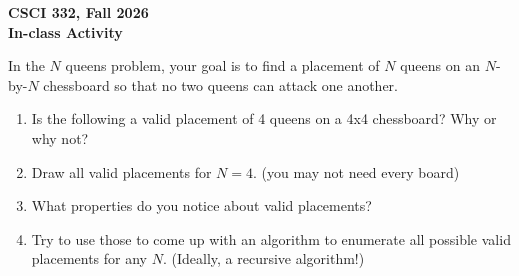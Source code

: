 \documentclass[11pt]{article}
\begin{document}
\begin{center}
\Large\textbf{CSCI 332, Fall 2026}%
\\
\LARGE\textbf{In-class Activity}%
\end{center}

In the $N$ queens problem, your goal is to find a placement of $N$
queens on an $N$-by-$N$ chessboard so that no two queens can attack one another.

\begin{enumerate}
\item
Is the following a valid placement of 4 queens
on a 4x4 chessboard? Why or why not?

\begin{center}
\end{center}

\item Draw all valid placements for $N=4$. (you may not need every board)


\begin{center}
\end{center}

\item What properties do you notice about valid placements?

\vspace{1in}

\item Try to use those to come up with an algorithm to enumerate all possible
valid placements for any $N$. (Ideally, a recursive algorithm!)

\end{enumerate}

\end{document}
